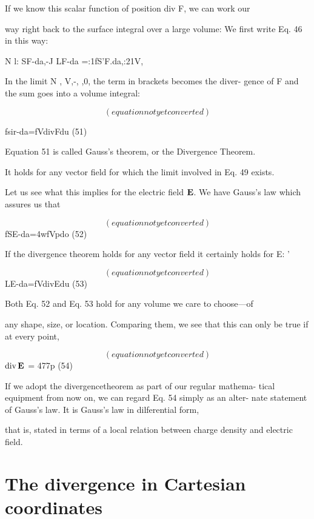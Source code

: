 If we know this scalar function of position div F, we can work our

way right back to the surface integral over a large volume: We first
write Eq. 46 in this way:

N l: SF-da,-J
LF-da =:1fS'F.da,:21V,~  

In the limit N , V,-, \rightarrow,0, the term in brackets becomes the diver-
gence of F and the sum goes into a volume integral:

\begin{equation}
(equation not yet converted)
\end{equation}

fsir-da=fVdivFdu (51)

Equation 51 is called Gauss's theorem, or the Divergence Theorem.

It holds for any vector field for which the limit involved in Eq. 49
exists.

Let us see what this implies for the electric field $\mathbf{E}$. We have
Gauss's law which assures us that

\begin{equation}
(equation not yet converted)
\end{equation}
fSE-da=4wfVpdo (52)

If the divergence theorem holds for any vector field it certainly holds
for E: '

\begin{equation}
(equation not yet converted)
\end{equation}
LE-da=fVdivEdu (53)

Both Eq. 52 and Eq. 53 hold for any volume we care to choose---of

any shape, size, or location. Comparing them, we see that this can
only be true if at every point,

\begin{equation}
(equation not yet converted)
\end{equation}
$\operatorname{div}\mathbf{E}$ = 477p (54)

If we adopt the divergencetheorem as part of our regular mathema-
tical equipment from now on, we can regard Eq. 54 simply as an alter-
nate statement of Gauss's law. It is Gauss's law in dilferential form,

that is, stated in terms of a local relation between charge density and
electric field.

\section{The divergence in Cartesian coordinates}

